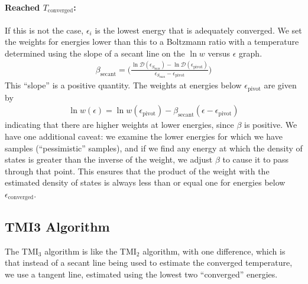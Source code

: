 \documentclass[letterpaper,twocolumn,amsmath,amssymb,pre,aps,10pt]{revtex4-1}
\begin{document}
\paragraph{Reached $T_\text{converged}$:}
If this is not the case, $\epsilon_i$ is the lowest energy that is
adequately converged.  We set the weights for energies lower than this
to a Boltzmann ratio with a temperature determined using the slope of
a secant line on the $\ln w$ versus $\epsilon$ graph.
\begin{align}
  \beta_\text{secant} = \bigg(\frac{\ln\mathcal{D}(\epsilon_{S_{\max}}) - \ln\mathcal{D}
  (\epsilon_\text{pivot})}{\epsilon_{S_{\max}}-\epsilon_\text{pivot}}\bigg)
\end{align}
This ``slope'' is a positive quantity.  The weights at energies below
$\epsilon_\text{pivot}$ are given by
\begin{align}
  \ln w(\epsilon) = \ln w(\epsilon_\text{pivot}) -
  \beta_\text{secant}(\epsilon - \epsilon_\text{pivot})
\end{align}
indicating that there are higher weights at lower energies, since
$\beta$ is positive.  We have one additional caveat: we examine the
lower energies for which we have samples (``pessimistic'' samples),
and if we find any energy at which the density of states is greater
than the inverse of the weight, we adjust $\beta$ to cause it to pass
through that point.  This ensures that the product of the weight with
the estimated density of states is always less than or equal one for
energies below $\epsilon_\text{converged}$.

\subsection{TMI3 Algorithm}
The TMI$_3$ algorithm is like the TMI$_2$ algorithm, with one
difference, which is that instead of a secant line being used to
estimate the converged temperature, we use a tangent line, estimated
using the lowest two ``converged'' energies.



\end{document}
